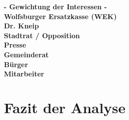 \smallskip \textbf{- Gewichtung der Interessen -} \\
\smallskip \textbf{Wolfsburger Ersatzkasse (WEK)} \\
\smallskip \textbf{Dr. Kneip} \\
\smallskip \textbf{Stadtrat / Opposition} \\
\smallskip \textbf{Presse} \\
\smallskip \textbf{Gemeinderat} \\
\smallskip \textbf{Bürger} \\
\smallskip \textbf{Mitarbeiter} \\

\section{Fazit der Analyse}